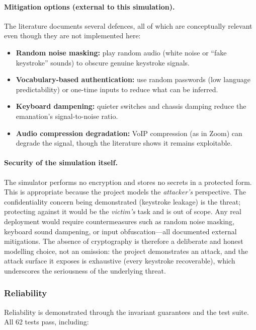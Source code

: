 \documentclass[11pt,a4paper]{article}
\begin{document}
\paragraph{Mitigation options (external to this simulation).}
The literature documents several defences, all of which are conceptually
relevant even though they are not implemented here:

\begin{itemize}
    \item \textbf{Random noise masking:} play random audio (white noise or
          ``fake keystroke'' sounds) to obscure genuine keystroke signals.
    \item \textbf{Vocabulary-based authentication:} use random passwords (low
          language predictability) or one-time inputs to reduce what can be
          inferred.
    \item \textbf{Keyboard dampening:} quieter switches and chassis damping
          reduce the emanation's signal-to-noise ratio.
    \item \textbf{Audio compression degradation:} VoIP compression (as in
          Zoom) can degrade the signal, though the literature shows it remains
          exploitable.
\end{itemize}

\paragraph{Security of the simulation itself.}
The simulator performs no encryption and stores no secrets in a protected form.
This is appropriate because the project models the \emph{attacker's}
perspective. The confidentiality concern being demonstrated (keystroke leakage)
is the threat; protecting against it would be the \emph{victim's} task and is
out of scope. Any real deployment would require countermeasures such as random
noise masking, keyboard sound dampening, or input obfuscation---all documented
external mitigations. The absence of cryptography is therefore a deliberate and
honest modelling choice, not an omission: the project demonstrates an attack,
and the attack surface it exposes is exhaustive (every keystroke recoverable),
which underscores the seriousness of the underlying threat.

\subsubsection{Reliability}

Reliability is demonstrated through the invariant guarantees and the test
suite. All 62 tests pass, including:
\end{document}
